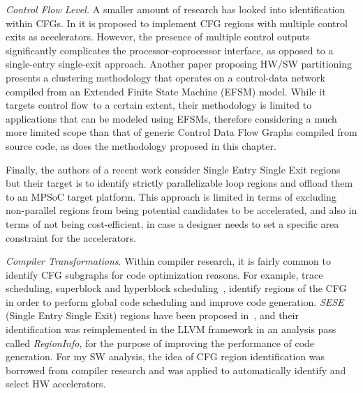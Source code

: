 \documentclass[]{usiinfthesis}
\newcommand{\controlflow}{control flow}
\begin{document}
\emph{Control Flow Level.}
A smaller amount of research has looked into
identification within CFGs. In \cite{ZuluagaJul09} it is
proposed to implement CFG regions with multiple control exits as
accelerators. However, the presence of multiple control outputs
significantly complicates the processor-coprocessor interface, as
opposed to a single-entry single-exit approach. 
Another paper proposing HW/SW partitioning~\cite{BaleaniMay02}
presents a clustering methodology that operates on a control-data
network compiled from an Extended Finite State Machine (EFSM)
model. While it targets \controlflow\ to a certain extent, their
methodology is limited to applications that can be modeled using
EFSMs, therefore considering a much more limited scope than that of
generic Control Data Flow Graphs compiled from source code, as does 
the methodology proposed in this chapter.

Finally, the authors of a recent work \cite{AguilarJune16} consider
Single Entry Single Exit regions but their target is to identify
strictly parallelizable loop regions and offload them to an MPSoC
target platform. This approach is limited in
terms of excluding non-parallel regions from being potential
candidates to be accelerated, and also in terms of not being cost-efficient, in case a
designer needs to set a specific area constraint for the accelerators.

\emph{Compiler Transformations}.
Within compiler research, it is fairly 
common to identify CFG subgraphs for code
optimization reasons. For example, trace scheduling, superblock and
hyperblock scheduling~\cite{HankSep93}, identify regions
of the CFG in order to perform global code scheduling and
improve code generation. \emph{SESE} (Single Entry
Single Exit) regions have been proposed in~\cite{JohnsonJun94}, and
their identification was reimplemented in the LLVM framework in an 
analysis pass
called \emph{RegionInfo}, for the purpose of improving the
performance of code generation. For my SW analysis, the idea of
CFG region identification was borrowed from compiler research and was 
applied to automatically identify and select HW accelerators.
\end{document}
